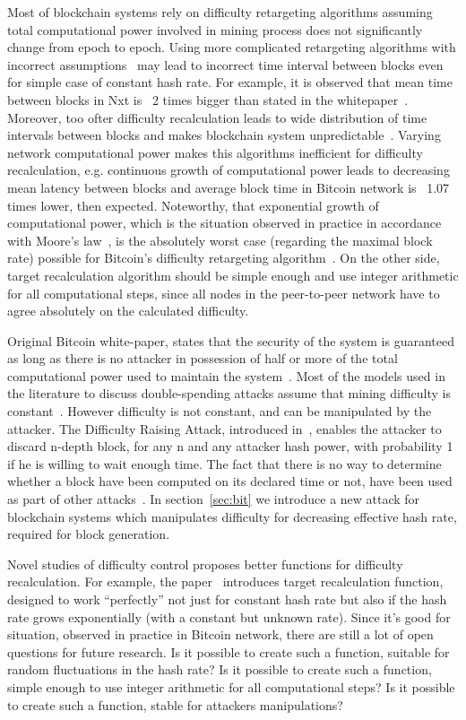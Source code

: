 \documentclass[]{llncs}
\begin{document}
Most of blockchain systems rely on difficulty retargeting algorithms assuming total computational power involved in mining process does not significantly change from epoch to epoch.
Using more complicated retargeting algorithms with incorrect assumptions~\cite{andruiman2014} may lead to incorrect time interval between blocks even for simple case of constant hash rate. For example, it is observed that mean time between blocks in Nxt is ~2 times bigger than stated in the whitepaper~\cite{nxt}. Moreover, too ofter difficulty recalculation leads to wide distribution of time intervals between blocks and makes blockchain system unpredictable~\cite{andruiman2014}.
Varying network computational power makes this algorithms inefficient for difficulty recalculation, e.g. continuous growth of computational power leads to decreasing mean latency between blocks and average block time in Bitcoin network is ~1.07 times lower, then expected.
Noteworthy, that exponential growth of computational power, which is the situation observed in practice in accordance with Moore’s law~\cite{moore2006cramming}, is the absolutely worst case (regarding the maximal block rate) possible for Bitcoin’s difficulty retargeting algorithm~\cite{kraft2015difficulty}.
On the other side, target recalculation algorithm should be simple enough and use integer arithmetic for all computational steps, since all nodes in the peer-to-peer network have to agree absolutely on the calculated difficulty.

Original Bitcoin white-paper, states that the security of the system is guaranteed as long as there is no attacker in possession of half or more of the total computational power used to maintain the system~\cite{Nakamoto2008}.
Most of the models used in the literature to discuss double-spending attacks assume that mining difficulty is constant~\cite{??}.
However difficulty is not constant, and can be manipulated by the attacker.
The Difficulty Raising Attack, introduced in~\cite{bahack2013theoretical}, enables the attacker to discard n-depth block, for any n and any attacker hash power, with probability 1 if he is willing to wait enough time.
The fact that there is no way to determine whether a block have been computed on its declared time or not, have been used as part of other attacks~\cite{timejacking2011, artforz2011}.
In section~\ref{sec:bit} we introduce a new attack for blockchain systems which manipulates difficulty for decreasing effective hash rate, required for block generation.

Novel studies of difficulty control proposes better functions for difficulty recalculation.
For example, the paper~\cite{kraft2015difficulty} introduces target recalculation function, designed to work “perfectly” not just for constant hash rate but also if the hash rate grows exponentially (with a constant but unknown rate).
Since it's good for situation, observed in practice in Bitcoin network, there are still a lot of open questions for future research.
Is it possible to create such a function, suitable for random fluctuations in the hash rate?
Is it possible to create such a function, simple enough to use integer arithmetic for all computational steps?
Is it possible to create such a function, stable for attackers manipulations?
\end{document}
